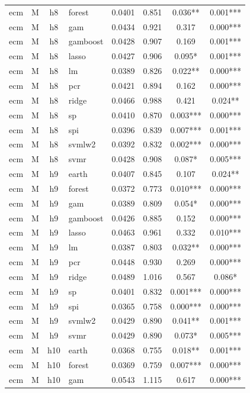 \begin{ThreePartTable}
\begin{longtable}[t]{llclcccc}
ecm & M & h8 & forest & 0.0401 & 0.851 & 0.036** & 0.001***\\
ecm & M & h8 & gam & 0.0434 & 0.921 & 0.317 & 0.000***\\
ecm & M & h8 & gamboost & 0.0428 & 0.907 & 0.169 & 0.001***\\
ecm & M & h8 & lasso & 0.0427 & 0.906 & 0.095* & 0.001***\\
ecm & M & h8 & lm & 0.0389 & 0.826 & 0.022** & 0.000***\\
ecm & M & h8 & pcr & 0.0421 & 0.894 & 0.162 & 0.000***\\
ecm & M & h8 & ridge & 0.0466 & 0.988 & 0.421 & 0.024**\\
ecm & M & h8 & sp & 0.0410 & 0.870 & 0.003*** & 0.000***\\
ecm & M & h8 & spi & 0.0396 & 0.839 & 0.007*** & 0.001***\\
ecm & M & h8 & svmlw2 & 0.0392 & 0.832 & 0.002*** & 0.000***\\
ecm & M & h8 & svmr & 0.0428 & 0.908 & 0.087* & 0.005***\\
\addlinespace
ecm & M & h9 & earth & 0.0407 & 0.845 & 0.107 & 0.024**\\
ecm & M & h9 & forest & 0.0372 & 0.773 & 0.010*** & 0.000***\\
ecm & M & h9 & gam & 0.0389 & 0.809 & 0.054* & 0.000***\\
ecm & M & h9 & gamboost & 0.0426 & 0.885 & 0.152 & 0.000***\\
ecm & M & h9 & lasso & 0.0463 & 0.961 & 0.332 & 0.010***\\
ecm & M & h9 & lm & 0.0387 & 0.803 & 0.032** & 0.000***\\
ecm & M & h9 & pcr & 0.0448 & 0.930 & 0.269 & 0.000***\\
ecm & M & h9 & ridge & 0.0489 & 1.016 & 0.567 & 0.086*\\
ecm & M & h9 & sp & 0.0401 & 0.832 & 0.001*** & 0.000***\\
ecm & M & h9 & spi & 0.0365 & 0.758 & 0.000*** & 0.000***\\
ecm & M & h9 & svmlw2 & 0.0429 & 0.890 & 0.041** & 0.001***\\
ecm & M & h9 & svmr & 0.0429 & 0.890 & 0.073* & 0.005***\\
\addlinespace
ecm & M & h10 & earth & 0.0368 & 0.755 & 0.018** & 0.001***\\
ecm & M & h10 & forest & 0.0369 & 0.759 & 0.007*** & 0.000***\\
ecm & M & h10 & gam & 0.0543 & 1.115 & 0.617 & 0.000***\\

\end{longtable}
\end{ThreePartTable}
